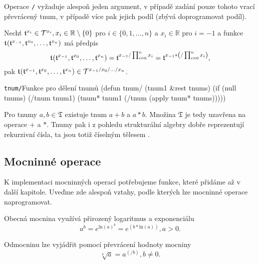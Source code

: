 Operace \texttt{/} vyžaduje alespoň jeden argument, v případě zadání pouze tohoto vrací převrácený tnum, v případě více pak jejich podíl (zbývá doprogramovat podíl).

\begin{fact}
Nechť $\mathfrak{t}^{x_i}\in\mathcal{T}^{x_i},x_i\in\mathbb{R}\setminus\{0\}$ pro $i\in\{0,1,\ldots ,n\}$ a $x_{i}\in\mathbb{R}$ pro $i=-1$ a funkce $\mathfrak{t}^{}(\mathfrak{t}^{x_{-1}},\mathfrak{t}^{x_0},\ldots,\mathfrak{t}^{x_n})$ má předpis
\begin{equation}
\mathfrak{t}^{}(\mathfrak{t}^{x_{-1}},\mathfrak{t}^{x_0},\ldots,\mathfrak{t}^{x_n})=\mathfrak{t}^{x_{-1}/\prod_{i=0}^nx_i}=\mathfrak{t}^{x_{-1}*\left(/\prod_{i=0}^nx_i\right)},
\end{equation}
pak $\mathfrak{t}^{}(\mathfrak{t}^{x_{-1}},\mathfrak{t}^{x_0},\ldots,\mathfrak{t}^{x_n})\in\mathcal{T}^{x_{-1}/x_0/\ldots /x_n}$.
\end{fact}

\begin{lispcode}{\texttt{tnum/}}{Funkce pro dělení tnumů}
(\textcolor{funkcionalni}{defun} \textcolor{pojmenovan}{tnum/} (tnum1 &rest tnums)
  (\textcolor{funkcionalni}{if} (\textcolor{funkcionalni}{null} tnums)
      (\textcolor{moje}{/tnum} tnum1)
    (\textcolor{moje}{tnum*} tnum1 (\textcolor{moje}{/tnum} (\textcolor{funkcionalni}{apply} \textquotesingle\textcolor{moje}{tnum*} tnums)))))
\end{lispcode}

Pro tnumy $a, b\in\mathfrak{T}$ existuje tnum $a+b$ a $a*b$. Množina $\mathfrak{T}$ je tedy uzavřena na operace $\texttt{+}$ a $\texttt{*}$. Tnumy pak i z pohledu strukturální algebry dobře reprezentují rekurzivní čísla, ta jsou totiž číselným tělesem \cite{rice:kompr}.

\subsection{Mocninné operace}
K implementaci mocninných operací potřebujeme funkce, které přidáme až v další kapitole. Uveďme zde alespoň vztahy, podle kterých lze mocninné operace naprogramovat.

Obecná mocnina využívá přirozený logaritmus a exponenciálu
\begin{equation}\label{rov:obmoc}
a^b=e^{\mathrm{ln}(a)^b}=e^{(b*\mathrm{ln}(a))},a>0.
\end{equation}

Odmocninu lze vyjádřit pomocí převrácení hodnoty mocniny
\begin{equation}\label{rov:odmoc}
\sqrt[b]{a}=a^{(/b)},b\neq0.
\end{equation}